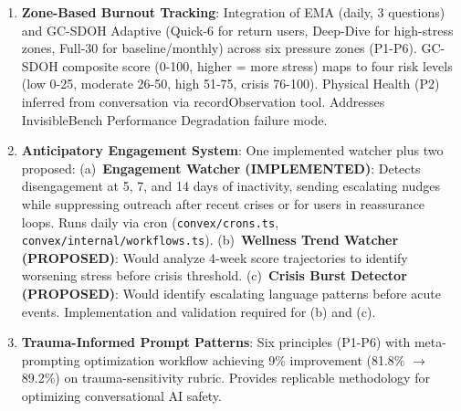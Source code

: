 \documentclass{article}
\begin{document}
\begin{enumerate}
\begin{tcolorbox}[colback=gcTan!20!white,colframe=gcOrange,title=\textbf{GC-SDOH Adaptive Validation Roadmap (Required Before Clinical Use)},boxrule=1.5pt]
\textbf{Psychometric Properties (Full-30)}:
\begin{itemize}[nosep,leftmargin=1em]
    \item Internal consistency: Cronbach's $\alpha$ and McDonald's $\omega$ per zone (target >0.70)
    \item Test-retest reliability: 2-week interval; intraclass correlation coefficient (target >0.75)
    \item Convergent validity: Correlations with Zarit Burden Interview, Caregiver Strain Index
    \item Factor structure: Confirmatory Factor Analysis (CFA) to verify 6-zone model (P1-P6)
    \item Differential Item Functioning (DIF): Equity analysis by race, income, language
    \item Criterion validity: ROC curves predicting SNAP enrollment, food bank use, respite care uptake
\end{itemize}

\textbf{Current Status}: Adaptive system in development; design contribution requiring validation
\end{tcolorbox}
    \item \textbf{Zone-Based Burnout Tracking}: Integration of EMA (daily, 3 questions) and GC-SDOH Adaptive (Quick-6 for return users, Deep-Dive for high-stress zones, Full-30 for baseline/monthly) across six pressure zones (P1-P6). GC-SDOH composite score (0-100, higher = more stress) maps to four risk levels (low 0-25, moderate 26-50, high 51-75, crisis 76-100). Physical Health (P2) inferred from conversation via recordObservation tool. Addresses InvisibleBench Performance Degradation failure mode.

    \item \textbf{Anticipatory Engagement System}: One implemented watcher plus two proposed: (a)~\textbf{Engagement Watcher (IMPLEMENTED)}: Detects disengagement at 5, 7, and 14 days of inactivity, sending escalating nudges while suppressing outreach after recent crises or for users in reassurance loops. Runs daily via cron (\texttt{convex/crons.ts}, \texttt{convex/internal/workflows.ts}). (b)~\textbf{Wellness Trend Watcher (PROPOSED)}: Would analyze 4-week score trajectories to identify worsening stress before crisis threshold. (c)~\textbf{Crisis Burst Detector (PROPOSED)}: Would identify escalating language patterns before acute events. Implementation and validation required for (b) and (c).

    \item \textbf{Trauma-Informed Prompt Patterns}: Six principles (P1-P6) with meta-prompting optimization workflow achieving 9\% improvement (81.8\% $\rightarrow$ 89.2\%) on trauma-sensitivity rubric. Provides replicable methodology for optimizing conversational AI safety.


\end{enumerate}
\end{document}
